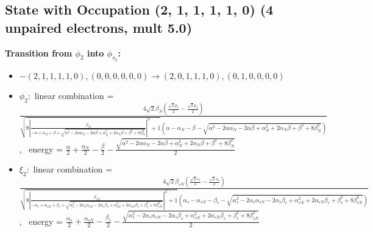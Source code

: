 \documentclass[12pt,a4paper]{article}
\begin{document}
\subsection*{State with Occupation (2, 1, 1, 1, 1, 0) (4 unpaired electrons, mult 5.0)}
        \noindent\textbf{Transition from $\phi_{2}$ into $\phi_{s_{2}}$:}
        \begin{itemize}
            \item $- (2, 1, 1, 1, 1, 0), (0, 0, 0, 0, 0, 0) \rightarrow (2, 0, 1, 1, 1, 0), (0, 1, 0, 0, 0, 0)$
        
            \item $\phi_{2}:$ linear combination = $\frac{4 \sqrt{2} \beta_{N} \left(\frac{\sqrt{2} p_{1}}{2} - \frac{\sqrt{2} p_{4}}{2}\right)}{\sqrt{8 \left|{\frac{\beta_{N}}{- \alpha + \alpha_{N} + \beta + \sqrt{\alpha^{2} - 2 \alpha \alpha_{N} - 2 \alpha \beta + \alpha_{N}^{2} + 2 \alpha_{N} \beta + \beta^{2} + 8 \beta_{N}^{2}}}}\right|^{2} + 1} \left(\alpha - \alpha_{N} - \beta - \sqrt{\alpha^{2} - 2 \alpha \alpha_{N} - 2 \alpha \beta + \alpha_{N}^{2} + 2 \alpha_{N} \beta + \beta^{2} + 8 \beta_{N}^{2}}\right)}$, \
            energy = $\frac{\alpha}{2} + \frac{\alpha_{N}}{2} - \frac{\beta}{2} - \frac{\sqrt{\alpha^{2} - 2 \alpha \alpha_{N} - 2 \alpha \beta + \alpha_{N}^{2} + 2 \alpha_{N} \beta + \beta^{2} + 8 \beta_{N}^{2}}}{2}$
            
            \item $\xi_{2}:$ linear combination = $\frac{4 \sqrt{2} \beta_{s N} \left(\frac{\sqrt{2} s_{1}}{2} - \frac{\sqrt{2} s_{4}}{2}\right)}{\sqrt{8 \left|{\frac{\beta_{s N}}{- \alpha_{s} + \alpha_{s N} + \beta_{s} + \sqrt{\alpha_{s}^{2} - 2 \alpha_{s} \alpha_{s N} - 2 \alpha_{s} \beta_{s} + \alpha_{s N}^{2} + 2 \alpha_{s N} \beta_{s} + \beta_{s}^{2} + 8 \beta_{s N}^{2}}}}\right|^{2} + 1} \left(\alpha_{s} - \alpha_{s N} - \beta_{s} - \sqrt{\alpha_{s}^{2} - 2 \alpha_{s} \alpha_{s N} - 2 \alpha_{s} \beta_{s} + \alpha_{s N}^{2} + 2 \alpha_{s N} \beta_{s} + \beta_{s}^{2} + 8 \beta_{s N}^{2}}\right)}$, \
            energy = $\frac{\alpha_{s}}{2} + \frac{\alpha_{s N}}{2} - \frac{\beta_{s}}{2} - \frac{\sqrt{\alpha_{s}^{2} - 2 \alpha_{s} \alpha_{s N} - 2 \alpha_{s} \beta_{s} + \alpha_{s N}^{2} + 2 \alpha_{s N} \beta_{s} + \beta_{s}^{2} + 8 \beta_{s N}^{2}}}{2}$
            

\end{itemize}
\end{document}
